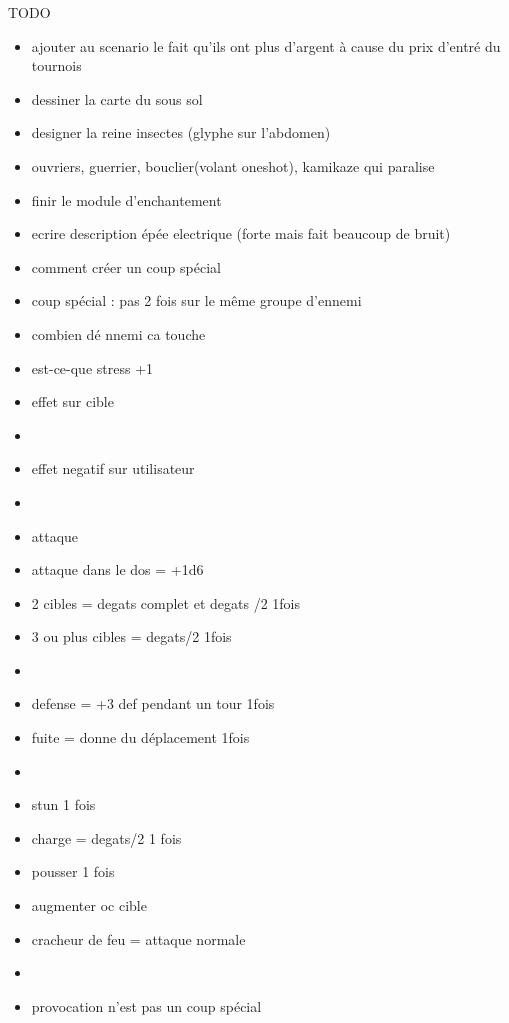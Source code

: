 \documentclass[11pt]{article} %
\begin{document}
TODO
\begin{itemize}
    \item ajouter au scenario le fait qu'ils ont plus d'argent à cause du prix d'entré du tournois
    \item dessiner la carte du sous sol
    \item designer la reine insectes (glyphe sur l'abdomen)
    \item ouvriers, guerrier, bouclier(volant oneshot), kamikaze qui paralise
    \item finir le module d'enchantement
    \item ecrire description épée electrique (forte mais fait beaucoup de bruit)
    \item comment créer un coup spécial

    \item coup spécial : pas 2 fois sur le même groupe d'ennemi
\end{itemize}


\begin{itemize}
    \item combien dé nnemi ca touche
    \item est-ce-que stress +1
    \item effet sur cible
    \item
    \item effet negatif sur utilisateur
    \item
    \item attaque
    \item attaque dans le dos = +1d6
    \item 2 cibles = degats complet et degats /2 1fois
    \item 3 ou plus cibles = degats/2 1fois
    \item
    \item defense = +3 def pendant un tour 1fois
    \item fuite = donne du déplacement 1fois
    \item
    \item stun 1 fois
    \item charge = degats/2 1 fois
    \item pousser 1 fois
    \item augmenter oc cible
    \item cracheur de feu = attaque normale
    \item
    \item provocation n'est pas un coup spécial

\end{itemize}
\end{document}

